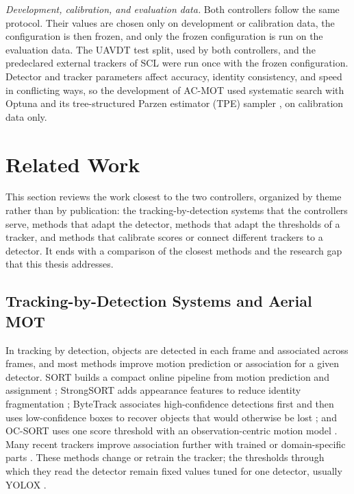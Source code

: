\emph{Development, calibration, and evaluation data.} Both controllers follow the same protocol. Their values are chosen only on development or calibration data, the configuration is then frozen, and only the frozen configuration is run on the evaluation data. The UAVDT test split, used by both controllers, and the predeclared external trackers of SCL were run once with the frozen configuration. Detector and tracker parameters affect accuracy, identity consistency, and speed in conflicting ways, so the development of AC-MOT used systematic search with Optuna and its tree-structured Parzen estimator (TPE) sampler \cite{akiba2019optuna}, on calibration data only.

\section{Related Work}\label{sec:rw}
This section reviews the work closest to the two controllers, organized by theme rather than by publication: the tracking-by-detection systems that the controllers serve, methods that adapt the detector, methods that adapt the thresholds of a tracker, and methods that calibrate scores or connect different trackers to a detector. It ends with a comparison of the closest methods and the research gap that this thesis addresses.

\subsection{Tracking-by-Detection Systems and Aerial MOT}\label{sec:rw-tbd}
In tracking by detection, objects are detected in each frame and associated across frames, and most methods improve motion prediction or association for a given detector. SORT builds a compact online pipeline from motion prediction and assignment \cite{bewley2016sort}; StrongSORT adds appearance features to reduce identity fragmentation \cite{du2023strongsort}; ByteTrack associates high-confidence detections first and then uses low-confidence boxes to recover objects that would otherwise be lost \cite{zhang2022bytetrack}; and OC-SORT uses one score threshold with an observation-centric motion model \cite{cao2023ocsort}. Many recent trackers improve association further with trained or domain-specific parts \cite{li2024fdbtrack,bao2024graphmatching,zhang2025sinkhorn,ding2025remot,liang2024motiontrack,sun2026bsr}. These methods change or retrain the tracker; the thresholds through which they read the detector remain fixed values tuned for one detector, usually YOLOX \cite{ge2021yolox}.


